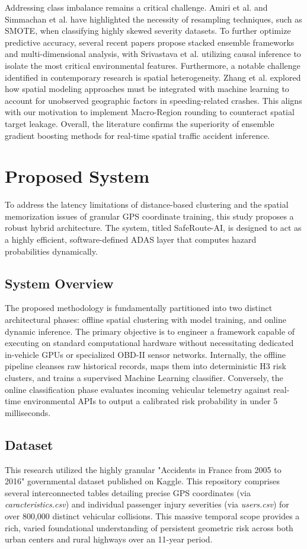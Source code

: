 \documentclass[conference]{IEEEtran}
\begin{document}
Addressing class imbalance remains a critical challenge. Amiri et al. \cite{ref3} and Simmachan et al. \cite{ref8} have highlighted the necessity of resampling techniques, such as SMOTE, when classifying highly skewed severity datasets. To further optimize predictive accuracy, several recent papers propose stacked ensemble frameworks and multi-dimensional analysis, with Srivastava et al. \cite{ref6} utilizing causal inference to isolate the most critical environmental features. Furthermore, a notable challenge identified in contemporary research is spatial heterogeneity. Zhang et al. \cite{ref7} explored how spatial modeling approaches must be integrated with machine learning to account for unobserved geographic factors in speeding-related crashes. This aligns with our motivation to implement Macro-Region rounding to counteract spatial target leakage. Overall, the literature confirms the superiority of ensemble gradient boosting methods for real-time spatial traffic accident inference.



\section{Proposed System}
To address the latency limitations of distance-based clustering and the spatial memorization issues of granular GPS coordinate training, this study proposes a robust hybrid architecture. The system, titled SafeRoute-AI, is designed to act as a highly efficient, software-defined ADAS layer that computes hazard probabilities dynamically.

\subsection{System Overview}
The proposed methodology is fundamentally partitioned into two distinct architectural phases: offline spatial clustering with model training, and online dynamic inference. The primary objective is to engineer a framework capable of executing on standard computational hardware without necessitating dedicated in-vehicle GPUs or specialized OBD-II sensor networks. Internally, the offline pipeline cleanses raw historical records, maps them into deterministic H3 risk clusters, and trains a supervised Machine Learning classifier. Conversely, the online classification phase evaluates incoming vehicular telemetry against real-time environmental APIs to output a calibrated risk probability in under 5 milliseconds.

\subsection{Dataset}
This research utilized the highly granular "Accidents in France from 2005 to 2016" governmental dataset published on Kaggle. This repository comprises several interconnected tables detailing precise GPS coordinates (via \textit{caracteristics.csv}) and individual passenger injury severities (via \textit{users.csv}) for over 800,000 distinct vehicular collisions. This massive temporal scope provides a rich, varied foundational understanding of persistent geometric risk across both urban centers and rural highways over an 11-year period.
\end{document}
